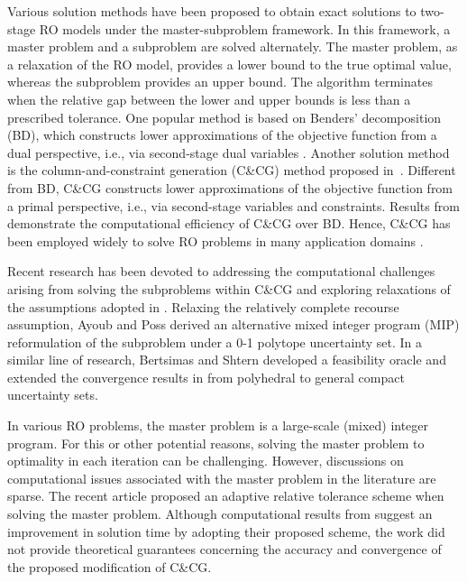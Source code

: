 \documentclass[preprint,review,11pt]{elsarticle}
\theoremstyle{definition}
\theoremstyle{remark}
\begin{document}
Various solution methods have been proposed to obtain exact solutions to two-stage RO models under the master-subproblem framework. In this framework, a master problem and a subproblem are solved alternately. The master problem, as a relaxation of the RO model, provides a lower bound to the true optimal value, whereas the subproblem provides an upper bound. The algorithm terminates when the relative gap between the lower and upper bounds is less than a prescribed tolerance. One popular method is based on Benders' decomposition (BD), which constructs lower approximations of the objective function from a dual perspective, i.e., via second-stage dual variables \citep{Jiang_et_al:2012,Thiele_et_al:2009}. Another solution method is the column-and-constraint generation (C\&CG) method proposed in~\cite{Zeng_Zhao:2013}. Different from BD, C\&CG constructs lower approximations of the objective function from a primal perspective, i.e., via second-stage variables and constraints. Results from \cite{Zeng_Zhao:2013} demonstrate the computational efficiency of C\&CG over BD. Hence, C\&CG has been employed widely to solve RO problems in many application domains \citep{An_et_al:2014, Du_et_al:2020, Ruiz_Conejo:2015, Zugno_Conejo:2015}.

Recent research has been devoted to addressing the computational challenges arising from solving the subproblems within C\&CG and exploring relaxations of the assumptions adopted in \cite{Zeng_Zhao:2013}. Relaxing the relatively complete recourse assumption, Ayoub and Poss \cite{Ayoub_Poss:2016} derived an alternative mixed integer program (MIP) reformulation of the subproblem under a 0-1 polytope uncertainty set. In a similar line of research, Bertsimas and Shtern \cite{Bertsimas_Shtern:2018} developed a feasibility oracle and extended the convergence results in \cite{Zeng_Zhao:2013} from polyhedral to general compact uncertainty sets.

In various RO problems, the master problem is a large-scale (mixed) integer program.  For this or other potential reasons, solving the master problem to optimality in each iteration can be challenging.  However, discussions on computational issues associated with the master problem in the literature are sparse. The recent article  \cite{Tonissen_et_al:2021} proposed an adaptive relative tolerance scheme when solving the master problem. Although computational results from \cite{Tonissen_et_al:2021} suggest an improvement in solution time by adopting their proposed scheme, the work did not provide theoretical guarantees concerning the accuracy and convergence of the proposed modification of C\&CG.
\end{document}
